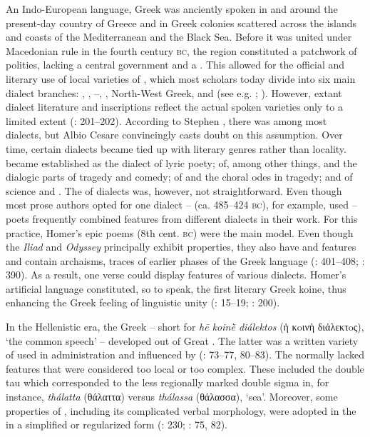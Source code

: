 An Indo-European language, Greek was anciently spoken in and around the present-day country of Greece and in Greek colonies scattered across the islands and coasts of the Mediterranean and the Black Sea. Before it was united under Macedonian rule in the fourth century \textsc{bc}, the region constituted a patchwork of polities, lacking a central government and a . This allowed for the official and literary use of local varieties of , which most scholars today divide into six main dialect branches: , , –, , North-West Greek, and  (see e.g. \citealt{Colvin2010}; \citealt{Finkelberg2014}). However, extant dialect literature and inscriptions reflect the actual spoken varieties only to a limited extent (\citealt{Colvin2010}: 201–202). According to Stephen \citet[300, 303]{Colvin1999}, there was  among most dialects, but Albio Cesare \citet[4--5]{Cassio2016} convincingly casts doubt on this assumption. Over time, certain dialects became tied up with literary genres rather than locality.  became established as the dialect of lyric poety;  of, among other things,  and the dialogic parts of tragedy and comedy;  of  and the choral odes in tragedy; and  of science and . The  of dialects was, however, not straightforward. Even though most prose authors opted for one dialect –  (ca. 485–424 \textsc{bc}), for example, used  – poets frequently combined features from different dialects in their work. For this practice, Homer’s epic poems (8th cent. \textsc{bc}) were the main model. Even though the \textit{Iliad} and \textit{Odyssey} principally exhibit  properties, they also have  and  features and contain archaisms, traces of earlier phases of the Greek language (\citealt{Hackstein2010}: 401–408; \citealt{Tribulato2010}: 390). As a result, one verse could display features of various dialects. Homer’s artificial language constituted, so to speak, the first literary Greek koine, thus enhancing the Greek feeling of linguistic unity (\citealt{Morpurgo1987}: 15–19; \citealt{Colvin2010}: 200).

In the Hellenistic era, the Greek  – short for \textit{hē koinḕ diálektos} (ἡ κoινὴ διάλεκτoς), ‘the common speech’ – developed out of Great . The latter was a written variety of  used in administration and influenced by  (\citealt{Horrocks2010}: 73–77, 80–83). The  normally lacked  features that were considered too local or too complex. These included the  double tau which corresponded to the less regionally marked double sigma in, for instance, \textit{thálatta} (θάλαττα) versus \textit{thálassa} (θάλασσα), ‘sea’. Moreover, some properties of , including its complicated verbal morphology, were adopted in the  in a simplified or regularized form (\citealt{Brixhe2010}: 230; \citealt{Horrocks2010}: 75, 82).

